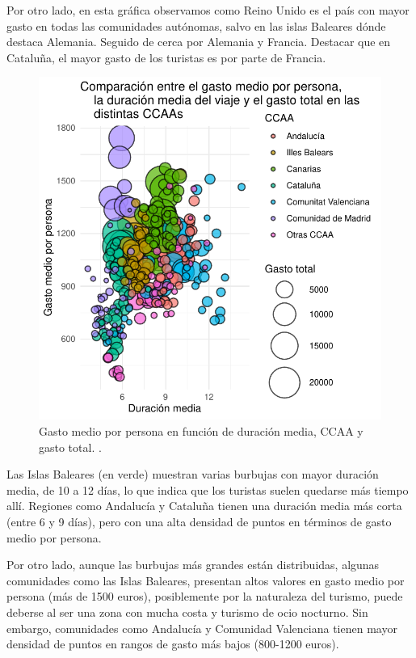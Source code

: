 \documentclass[data,article,submit,moreauthors,pdftex]{Definitions/mdpi}
\begin{document}
Por otro lado, en esta gráfica observamos como Reino Unido es el país
con mayor gasto en todas las comunidades autónomas, salvo en las islas
Baleares dónde destaca Alemania. Seguido de cerca por Alemania y
Francia. Destacar que en Cataluña, el mayor gasto de los turistas es por
parte de Francia.

\begin{figure}[H]
\includegraphics{ProyectoAED2024_Rmd_files/figure-latex/unnamed-chunk-24-1} \caption{Gasto medio por persona en función de duración media, CCAA y gasto total. .\label{fig:bubblegraph}}\label{fig:unnamed-chunk-24}
\end{figure}

Las Islas Baleares (en verde) muestran varias burbujas con mayor
duración media, de 10 a 12 días, lo que indica que los turistas suelen
quedarse más tiempo allí. Regiones como Andalucía y Cataluña tienen una
duración media más corta (entre 6 y 9 días), pero con una alta densidad
de puntos en términos de gasto medio por persona.

Por otro lado, aunque las burbujas más grandes están distribuidas,
algunas comunidades como las Islas Baleares, presentan altos valores en
gasto medio por persona (más de 1500 euros), posiblemente por la
naturaleza del turismo, puede deberse al ser una zona con mucha costa y
turismo de ocio nocturno. Sin embargo, comunidades como Andalucía y
Comunidad Valenciana tienen mayor densidad de puntos en rangos de gasto
más bajos (800-1200 euros).
\end{document}
